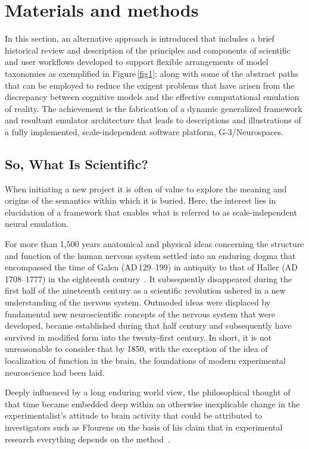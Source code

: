\documentclass[10pt,letterpaper]{article}
\begin{document}
\section*{Materials and methods}

In this section, an alternative approach is introduced that includes a brief historical review and description of the principles and components of scientific and user workflows developed to support flexible arrangements of model taxonomies as exemplified in Figure\,\ref{fig1}; along with some of the abstract paths that can be employed to reduce the exigent problems that have arisen from the discrepancy between cognitive models and the effective computational emulation of reality. The achievement is the fabrication of a dynamic generalized framework and resultant emulator architecture that leads to descriptions and illustrations of a fully implemented, scale-independent software platform, G-3/Neurospaces.

\subsection*{So, What Is Scientific?}

When initiating a new project it is often of value to explore the meaning and origins of the semantics within which it is buried. Here, the interest lies in elucidation of a framework that enables what is referred to as scale-independent neural emulation.

For more than 1,500 years anatomical and physical ideas concerning the structure and function of the human nervous system settled into an enduring dogma that encompassed the time of Galen ({\small{AD}}\,129--199) in antiquity to that of Haller ({\small{AD}}\,1708--1777) in the eighteenth century~\cite{clarke87}. It subsequently disappeared during the first half of the nineteenth century as a scientific revolution ushered in a new understanding of the nervous system. Outmoded ideas were displaced by fundamental new neuroscientific concepts of the nervous system that were developed, became established during that half century and subsequently have survived in modified form into the twenty-first century. In short, it is not unreasonable to consider that by 1850, with the exception of the idea of localization of function in the brain, the foundations of modern experimental neuroscience had been laid.

Deeply influenced by a long enduring world view, the philosophical thought of that time became embedded deep within an otherwise inexplicable change in the experimentalist's attitude to brain activity that could be attributed to investigators such as Flourens on the basis of his claim that in experimental research everything depends on the method~\cite{flourens24}.
\end{document}
